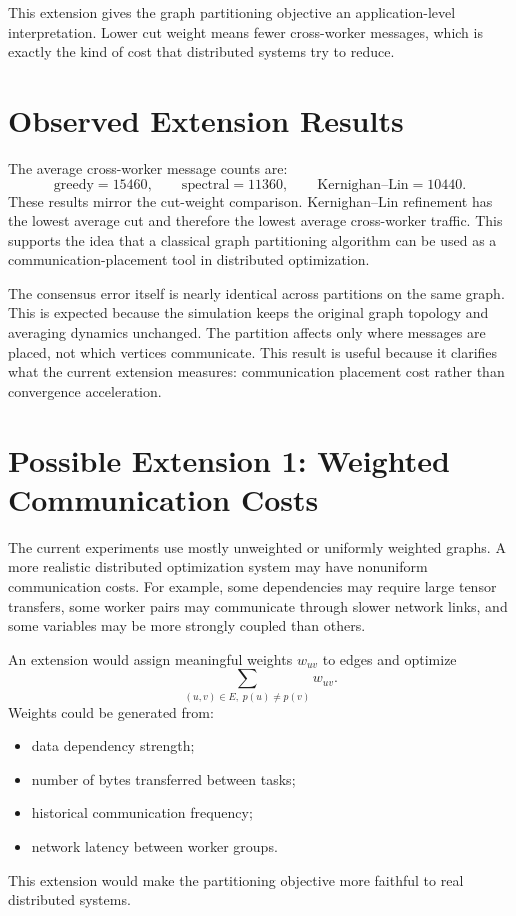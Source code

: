 \documentclass[11pt]{article}
\begin{document}
This extension gives the graph partitioning objective an application-level
interpretation. Lower cut weight means fewer cross-worker messages, which is
exactly the kind of cost that distributed systems try to reduce.

\section{Observed Extension Results}

The average cross-worker message counts are:
\[
    \text{greedy}=15460,\qquad
    \text{spectral}=11360,\qquad
    \text{Kernighan--Lin}=10440.
\]
These results mirror the cut-weight comparison. Kernighan--Lin refinement has
the lowest average cut and therefore the lowest average cross-worker traffic.
This supports the idea that a classical graph partitioning algorithm can be
used as a communication-placement tool in distributed optimization.

The consensus error itself is nearly identical across partitions on the same
graph. This is expected because the simulation keeps the original graph
topology and averaging dynamics unchanged. The partition affects only where
messages are placed, not which vertices communicate. This result is useful
because it clarifies what the current extension measures: communication
placement cost rather than convergence acceleration.

\section{Possible Extension 1: Weighted Communication Costs}

The current experiments use mostly unweighted or uniformly weighted graphs. A
more realistic distributed optimization system may have nonuniform
communication costs. For example, some dependencies may require large tensor
transfers, some worker pairs may communicate through slower network links, and
some variables may be more strongly coupled than others.

An extension would assign meaningful weights $w_{uv}$ to edges and optimize
\[
    \sum_{(u,v)\in E,\;p(u)\neq p(v)} w_{uv}.
\]
Weights could be generated from:
\begin{itemize}
    \item data dependency strength;
    \item number of bytes transferred between tasks;
    \item historical communication frequency;
    \item network latency between worker groups.
\end{itemize}
This extension would make the partitioning objective more faithful to real
distributed systems.
\end{document}
